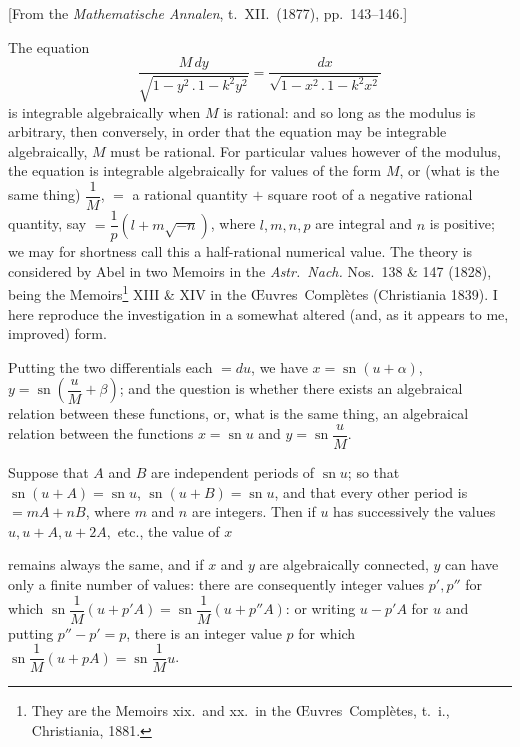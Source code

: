 \documentclass[11pt,a4paper]{article}
\providecommand{\sn}{\operatorname{sn}}
\providecommand{\OEuvres}{{\OE}uvres}
\begin{document}
\medskip

\begin{center}
[From the \emph{Mathematische Annalen}, t.~XII.\ (1877), pp.~143--146.]
\end{center}

\medskip

\noindent The equation
\[
\frac{M\,dy}{\sqrt{1 - y^{2}\,.\,1 - k^{2}y^{2}}} = \frac{dx}{\sqrt{1 - x^{2}\,.\,1 - k^{2}x^{2}}}
\]
is integrable algebraically when $M$ is rational: and so long as the modulus is arbitrary, then conversely, in order that the equation may be integrable algebraically, $M$ must be rational. For particular values however of the modulus, the equation is integrable algebraically for values of the form $M$, or (what is the same thing) $\dfrac{1}{M}$, $=$ a rational quantity $+$ square root of a negative rational quantity, say $=\dfrac{1}{p}(l + m\sqrt{-n})$, where $l, m, n, p$ are integral and $n$ is positive; we may for shortness call this a half-rational numerical value. The theory is considered by Abel in two Memoirs in the \emph{Astr.\ Nach.} Nos.\ 138 \& 147 (1828), being the Memoirs\footnote{They are the Memoirs xix.\ and xx.\ in the \OEuvres\ Compl\`etes, t.~i., Christiania, 1881.} XIII \& XIV in the \OEuvres\ Compl\`etes (Christiania 1839). I here reproduce the investigation in a somewhat altered (and, as it appears to me, improved) form.

Putting the two differentials each $= du$, we have $x = \sn(u + \alpha)$, $y = \sn\!\left(\dfrac{u}{M} + \beta\right)$; and the question is whether there exists an algebraical relation between these functions, or, what is the same thing, an algebraical relation between the functions $x = \sn u$ and $y = \sn\dfrac{u}{M}$.

Suppose that $A$ and $B$ are independent periods of $\sn u$; so that $\sn(u + A) = \sn u$, $\sn(u + B) = \sn u$, and that every other period is $= mA + nB$, where $m$ and $n$ are integers. Then if $u$ has successively the values $u, u + A, u + 2A,$ etc., the value of $x$

\newpage


remains always the same, and if $x$ and $y$ are algebraically connected, $y$ can have only a finite number of values: there are consequently integer values $p', p''$ for which $\sn\dfrac{1}{M}(u + p'A) = \sn\dfrac{1}{M}(u + p''A)$: or writing $u - p'A$ for $u$ and putting $p'' - p' = p$, there is an integer value $p$ for which $\sn\dfrac{1}{M}(u + pA) = \sn\dfrac{1}{M}u$.
\end{document}

